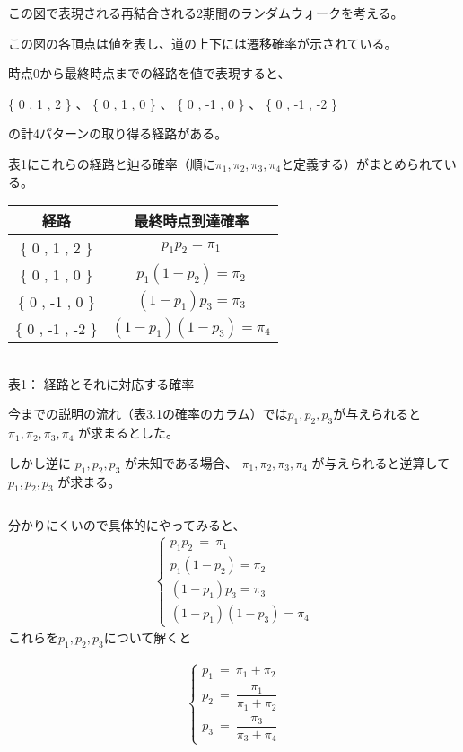 \documentclass[uplatex,a4j,12pt,dvipdfmx]{jsarticle}
\begin{document}
この図で表現される再結合される2期間のランダムウォークを考える。

この図の各頂点は値を表し、道の上下には遷移確率が示されている。

時点0から最終時点までの経路を値で表現すると、

\hspace{20mm}
\{ 0 , 1 , 2 \}
、
\{ 0 , 1 , 0 \}
、
\{ 0 , -1 , 0 \}
、
\{ 0 , -1 , -2 \}

の計4パターンの取り得る経路がある。

表1にこれらの経路と辿る確率（順に$\pi_{1},\pi_{2},\pi_{3},\pi_{4}$と定義する）がまとめられている。

\begin{center}
	\begin{tabular}{|c|c|} \hline
		経路                & 最終時点到達確率                            \\ \hline
		\{ 0 , 1 , 2 \}   & $　p_{1} p_{2} = \pi_{1} $           \\ \hline
		\{ 0 , 1 , 0 \}   & $　p_{1} (1 - p_{2}) = \pi_{2} $     \\ \hline
		\{ 0 , -1 , 0 \}  & $　(1-p_{1}) p_{3} = \pi_{3} $       \\ \hline
		\{ 0 , -1 , -2 \} & $　(1-p_{1}) (1 - p_{3}) = \pi_{4} $ \\ \hline
	\end{tabular}
	\\ 表1： 経路とそれに対応する確率
\end{center}
今までの説明の流れ（表3.1の確率のカラム）では$p_{1},p_{2},p_{3}$が与えられると
$\pi_{1},\pi_{2},\pi_{3},\pi_{4}$
が求まるとした。

しかし逆に
$p_{1},p_{2},p_{3}$
が未知である場合、
$\pi_{1},\pi_{2},\pi_{3},\pi_{4}$
が与えられると逆算して
$p_{1},p_{2},p_{3}$
が求まる。

${}$

分かりにくいので具体的にやってみると、
%
\begin{eqnarray*}
	\left\{
	\begin{array}{r}
		p_{1} p_{2} \ = \ \pi_{1}
		\\
		p_{1} (1 - p_{2}) = \pi_{2}
		\\
		(1 - p_{1}) p_{3} = \pi_{3}
		\\
		(1 - p_{1}) (1 -p_{3}) = \pi_{4}
	\end{array}
	\right.
\end{eqnarray*}
%
これらを$p_{1},p_{2},p_{3}$について解くと

\begin{eqnarray*}
	\left\{
	\begin{array}{c}
		p_{1} \ = \ \pi_{1} + \pi_{2}
		\\[3mm]
		p_{2} \ = \ \dfrac{\pi_{1}}{ \pi_{1} + \pi_{2} }
		\\[3mm]
		p_{3} \ = \ \dfrac{\pi_{3}}{ \pi_{3} + \pi_{4} }
	\end{array}
	\right.
\end{eqnarray*}
\end{document}
